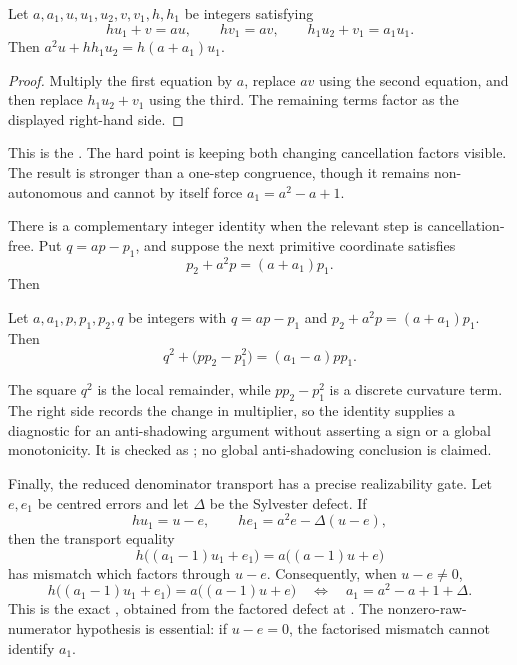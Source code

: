 \documentclass[11pt]{article}
\begin{document}
\begin{theorem}\label{long243:res:secondorder}
Let $a,a_1,u,u_1,u_2,v,v_1,h,h_1$ be integers satisfying
\[
 hu_1+v=au,\qquad hv_1=av,\qquad h_1u_2+v_1=a_1u_1.
\]
Then $a^2u+hh_1u_2=h(a+a_1)u_1$.
\end{theorem}

\begin{proof}
Multiply the first equation by $a$, replace $av$ using the second equation,
and then replace $h_1u_2+v_1$ using the third.  The remaining terms factor as
the displayed right-hand side.
\end{proof}

\noindent This is the
.  The hard point is keeping both changing cancellation
factors visible.  The result is stronger than a one-step congruence, though it
remains non-autonomous and cannot by itself force $a_1=a^2-a+1$.

There is a complementary integer identity when the relevant step is
cancellation-free.  Put $q=ap-p_1$, and suppose the next primitive coordinate
satisfies
\[
 p_2+a^2p=(a+a_1)p_1.
\]
Then
\begin{theorem}\label{long243:res:curvature}
Let $a,a_1,p,p_1,p_2,q$ be integers with $q=ap-p_1$ and
$p_2+a^2p=(a+a_1)p_1$.  Then
\[
 q^2+\bigl(pp_2-p_1^2\bigr)=(a_1-a)pp_1.
\]
\end{theorem}

The square $q^2$ is the local remainder, while $pp_2-p_1^2$ is a discrete
curvature term.  The right side records the change in multiplier, so the
identity supplies a diagnostic for an anti-shadowing argument without
asserting a sign or a global monotonicity.  It is checked as
; no global anti-shadowing conclusion is
claimed.

Finally, the reduced denominator transport has a precise realizability gate.
Let $e,e_1$ be centred errors and let $\Delta$ be the Sylvester defect.  If
\[
 hu_1=u-e,
 \qquad he_1=a^2e-\Delta(u-e),
\]
then the transport equality
\[
 h\bigl((a_1-1)u_1+e_1\bigr)
   =a\bigl((a-1)u+e\bigr)
\]
has mismatch which factors through $u-e$.  Consequently, when $u-e\ne0$,
\[
 h\bigl((a_1-1)u_1+e_1\bigr)
   =a\bigl((a-1)u+e\bigr)
 \quad\Longleftrightarrow\quad
 a_1=a^2-a+1+\Delta.
\]
This is the exact
, obtained from the factored defect at
.  The nonzero-raw-numerator hypothesis is essential: if
$u-e=0$, the factorised mismatch cannot identify $a_1$.
\end{document}
